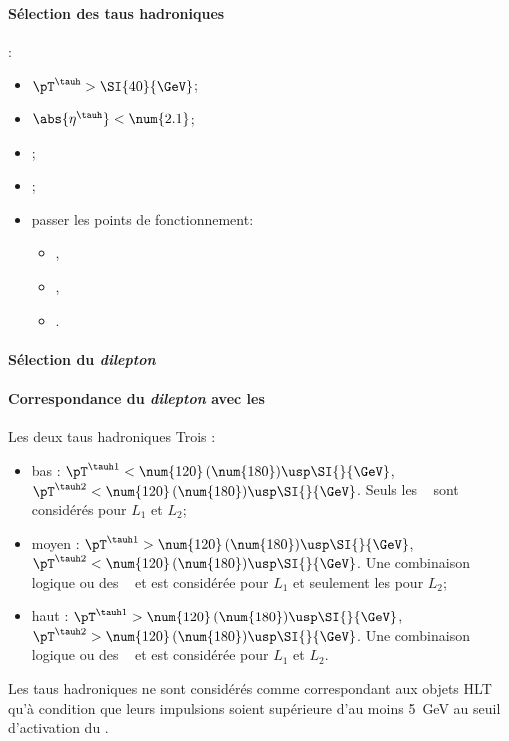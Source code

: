 \paragraph{Sélection des taus hadroniques}
:
\begin{itemize}
    \item $\pT^{\tauh} > \SI{40}{\GeV}$;
    \item $\abs{\eta^{\tauh}} < \num{2.1}$;
    \item \TauHdz;
    \item \NewDecayModeFinding[footnote];
    \item passer les points de fonctionnement:
        \begin{itemize}
            \item {},
            \item {},
            \item {}.
        \end{itemize}
\end{itemize}
\paragraph{Sélection du \emph{dilepton}}
\AtLeastOneOSPair{\tauh\tauh}
\IfMoreOnePair
\paragraph{Correspondance du \emph{dilepton} avec les \HLTpaths}
Les deux taus hadroniques \FromPairMatchToHLTObjects{}
Trois \HLTregionsDefined:
\begin{itemize}
    \item bas \pT: $\pT^{\tauh 1} < \num{120} \, (\num{180}) \usp \SI{}{\GeV}$, $\pT^{\tauh 2} < \num{120} \, (\num{180}) \usp \SI{}{\GeV}$.
        Seuls les \HLTpaths\ \HLTDoubleTau{} sont considérés pour $L_1$ et $L_2$;
    \item moyen \pT: $\pT^{\tauh 1} > \num{120} \, (\num{180}) \usp \SI{}{\GeV}$, $\pT^{\tauh 2} < \num{120} \, (\num{180}) \usp \SI{}{\GeV}$.
        Une combinaison logique \og ou \fg{} des \HLTpaths\ \HLTSingleTau{} et \HLTDoubleTau{} est considérée pour $L_1$ et seulement les \HLTDoubleTau{} pour $L_2$;
    \item haut \pT: $\pT^{\tauh 1} > \num{120} \, (\num{180}) \usp \SI{}{\GeV}$, $\pT^{\tauh 2} > \num{120} \, (\num{180}) \usp \SI{}{\GeV}$.
        Une combinaison logique \og ou \fg{} des \HLTpaths\ \HLTSingleTau{} et \HLTDoubleTau{} est considérée pour $L_1$ et $L_2$.
\end{itemize}
Les taus hadroniques ne sont considérés comme correspondant aux objets HLT qu'à condition que leurs impulsions soient supérieure d'au moins \SI{5}{\GeV} au seuil d'activation du \HLTpath.
